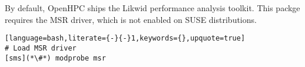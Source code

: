 \begin{center}
\begin{tcolorbox}[]
\small
By default, OpenHPC ships the Likwid performance analysis toolkit. This packge 
requires the MSR driver, which is not enabled on SUSE distributions. 
\begin{lstlisting}[language=bash,literate={-}{-}1,keywords={},upquote=true]
# Load MSR driver
[sms](*\#*) modprobe msr
\end{lstlisting}
\end{tcolorbox}
\end{center}



